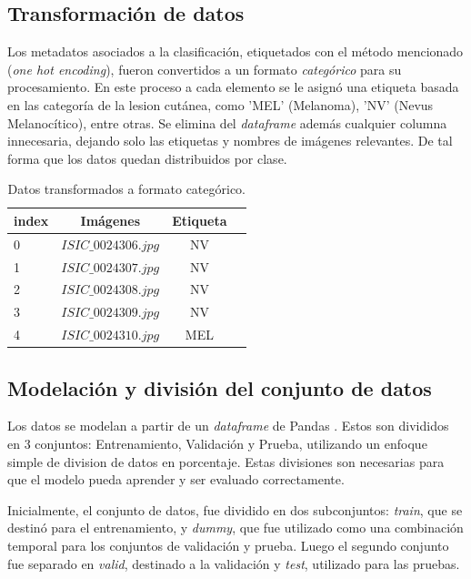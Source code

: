 \subsection{Transformación de datos}

Los metadatos asociados a la clasificación, etiquetados con el método mencionado (\textit{one hot encoding}), fueron convertidos a un formato \textit{categórico}  para su procesamiento. En este proceso a cada elemento se le asignó una etiqueta basada en las categoría de la lesion cutánea, como 'MEL' (Melanoma), 'NV' (Nevus Melanocítico), entre otras. Se elimina del \textit{dataframe} además cualquier columna innecesaria, dejando solo las etiquetas y nombres de imágenes relevantes. De tal forma que los datos quedan distribuidos por clase.

\begin{table}[ht]
   \centering
   \begin{tabular}{lccc}
   \hline
   \textbf{index} & \textbf{Imágenes} & \textbf{Etiqueta} \\
   \hline
      0 & $ISIC\_0024306.jpg$ & NV \\
      1 & $ISIC\_0024307.jpg$ & NV \\
      2 & $ISIC\_0024308.jpg$ & NV \\
      3 & $ISIC\_0024309.jpg$ & NV \\
      4 & $ISIC\_0024310.jpg$ & MEL \\
   \hline
   \end{tabular}
   \caption{Datos transformados a formato categórico.}
   \label{}
\end{table}   

\subsection{Modelación y división del conjunto de datos}

Los datos se modelan a partir de un \textit{dataframe} de Pandas . Estos son divididos en 3 conjuntos: Entrenamiento, Validación y Prueba, utilizando un enfoque simple de division de datos en porcentaje. Estas divisiones son necesarias para que el modelo pueda aprender y ser evaluado correctamente.

Inicialmente, el conjunto de datos, fue dividido en dos subconjuntos: \textit{train}, que se destinó para el entrenamiento, y \textit{dummy}, que fue utilizado como una combinación temporal para los conjuntos de validación y prueba. Luego el segundo conjunto fue separado en \textit{valid}, destinado a la validación y \textit{test}, utilizado para las pruebas.

